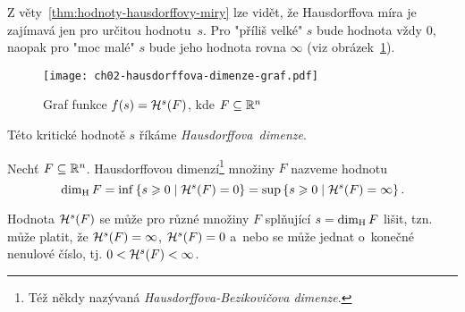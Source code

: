 Z věty~\ref{thm:hodnoty-hausdorffovy-miry} lze vidět, že Hausdorffova míra je zajímavá jen pro určitou hodnotu~$s$. Pro "příliš velké" $s$ bude hodnota vždy $0$, naopak pro "moc malé" $s$ bude jeho hodnota rovna $\infty$ (viz obrázek~\ref{fig:hausdorffova-dimenze-graf}).
\begin{figure}[h]
    \centering
    \texttt{[image: ch02-hausdorffova-dimenze-graf.pdf]}
    \caption{Graf funkce $f(s)=\mathcal{H}^{s}(F)$, kde $F\subseteq\mathbb{R}^n$}
    \label{fig:hausdorffova-dimenze-graf}
\end{figure}
Této kritické hodnotě $s$ říkáme \emph{Hausdorffova~dimenze}.
\begin{definition}\label{def:hausdorffova-dimenze}
    Nechť $F\subseteq\mathbb{R}^n$. Hausdorffovou dimenzí\footnote{Též někdy nazývaná \emph{Hausdorffova-Bezikovičova dimenze}. } množiny $F$ nazveme hodnotu
    \[\operatorname{dim_H}{F}=\inf\left\{s\geqslant 0\mid\mathcal{H}^{s}(F)=0\right\}=\sup\left\{s\geqslant 0\mid\mathcal{H}^{s}(F)=\infty\right\}.\]
\end{definition}
Hodnota $\mathcal{H}^{s}(F)$ se může pro různé množiny $F$ splňující $s=\operatorname{dim_H}{F}$ lišit, tzn. může platit, že $\mathcal{H}^{s}(F)=\infty$, $\mathcal{H}^{s}(F)=0$ a~nebo se může jednat o~konečné nenulové číslo, tj. $0<\mathcal{H}^{s}(F)<\infty$.

